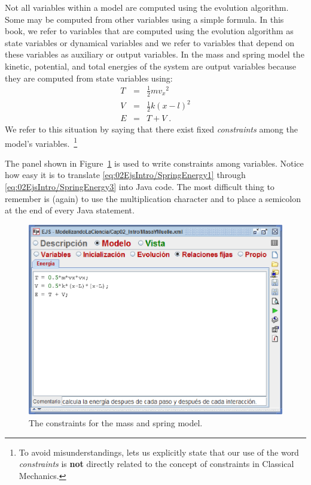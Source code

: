 Not all variables within a model are computed using the evolution algorithm. Some may be computed from other variables
using a simple formula. In this book, we refer to variables that are computed using the evolution algorithm as state variables or
dynamical variables and we refer to variables that depend on these variables as auxiliary or output variables. In the mass and
spring model the kinetic, potential, and total energies of the system are output variables because they are computed
from state variables using:
\begin{eqnarray}
  T &=& \frac{1}{2} m {v_x}^2              \label{eq:02EjsIntro/SpringEnergy1} \\
  V &=& \frac{1}{2} k (x-l)^2    \label{eq:02EjsIntro/SpringEnergy2} \\
  E &=& T + V  \;.                            \label{eq:02EjsIntro/SpringEnergy3}
\end{eqnarray}
We refer to this situation by saying that there exist fixed \emph{constraints} among the
model's variables.~\footnote{To avoid misunderstandings, lets us explicitly state that our use of the word
\emph{constraints} is \textbf{not} directly related to the concept of constraints in Classical Mechanics.}

The  panel shown in Figure~\ref{fig:02EjsIntro/ModelConstraints} is used to write constraints among
variables. Notice how easy it is to translate \eqref{eq:02EjsIntro/SpringEnergy1} through
\eqref{eq:02EjsIntro/SpringEnergy3} into Java code. The most difficult thing to remember is (again) to
use the multiplication character \lit{*} and to place a semicolon at the end of every Java statement.

\begin{figure}[htb]
    \centering
  \includegraphics[scale=\scale]{02EjsIntro/images/ModelConstraints.eps}
    \caption{The constraints for the mass and spring model.}
    \label{fig:02EjsIntro/ModelConstraints}
\end{figure}


